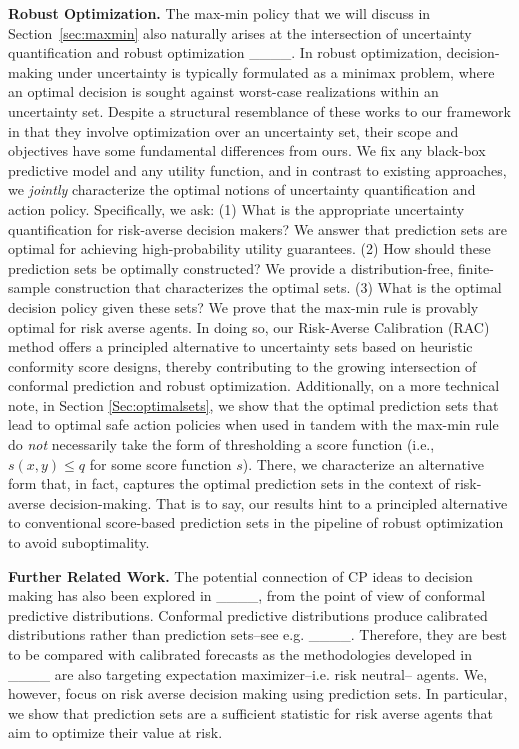 \textbf{Robust Optimization.} The max-min policy that we will discuss in Section~\ref{sec:maxmin} also naturally arises at the intersection of uncertainty quantification and robust optimization ____. 
In robust optimization, decision-making under uncertainty is typically formulated as a minimax problem, where an optimal decision is sought against worst-case realizations within an uncertainty set. Despite a structural resemblance of these works to our framework in that they involve optimization over an uncertainty set,  their scope and objectives have some fundamental differences from ours. We fix any black-box predictive model and any utility function, and in contrast to existing approaches, we \emph{jointly} characterize the optimal notions of uncertainty quantification and action policy. Specifically, we ask: (1) What is the appropriate uncertainty quantification for risk-averse decision makers? We answer that prediction sets are optimal for achieving high-probability utility guarantees. (2) How should these prediction sets be optimally constructed? We provide a distribution-free, finite-sample construction that characterizes the optimal sets. (3) What is the optimal decision policy given these sets? We prove that the max-min rule is provably optimal for risk averse agents. In doing so, our Risk-Averse Calibration (RAC) method offers a principled alternative to uncertainty sets based on heuristic conformity score designs, thereby contributing to the growing intersection of conformal prediction and robust optimization. Additionally, on a more technical note, in Section \ref{Sec:optimalsets}, we show that the optimal prediction sets that lead to optimal safe action policies when used in tandem with the max-min rule do \emph{not} necessarily take the form of thresholding a score function (i.e., $s(x,y) \leq q$ for some score function $s$). There, we characterize an alternative form that, in fact, captures the optimal prediction sets in the context of risk-averse decision-making. That is to say, our results hint to a principled alternative to conventional score-based prediction sets in the pipeline of robust optimization to avoid suboptimality.

\textbf{Further Related Work.} The potential connection of CP ideas to decision making has also been explored in ____, from the point of view of conformal predictive distributions. Conformal predictive distributions produce calibrated distributions rather than prediction sets--see e.g. ____. Therefore, they are best to be compared with calibrated forecasts as the methodologies developed in ____ are also targeting expectation maximizer--i.e. risk neutral-- agents. We, however, focus on risk averse decision making using prediction sets. In particular, we show that prediction sets are a sufficient statistic for risk averse agents that aim to optimize their value at risk. 

